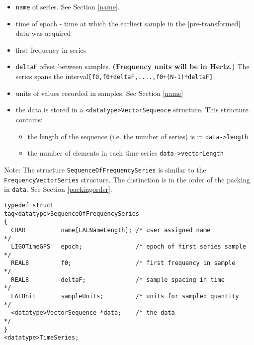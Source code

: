 \documentclass[]{ligodcc}
\begin{document}
\begin{itemize}
\vspace{-0.15in}
\item
{\tt name} of series. See Section \ref{name}.
\vspace{-0.15in}
\item
time of {epoch} - time at which the earliest sample in the
[pre-transformed] data was acquired
\vspace{-0.15in}
\item
first frequency in series
\vspace{-0.15in}
\item
{\tt deltaF} offset between samples.  {\bf (Frequency units will be in Hertz.)}
The series spans the interval{\tt [f0,f0+deltaF,....,f0+(N-1)*deltaF]}
\vspace{-0.15in}
\item
units of values recorded in samples. See Section \ref{name}
\vspace{-0.15in}
\item
the data is stored in a {\tt <datatype>VectorSequence}  structure. This structure contains:
\begin{itemize}
\vspace{-0.10in}
\item
the length of the sequence (i.e. the number of series) is  in {\tt data->length}
\vspace{-0.10in}
\item
 the number of elements in each time series {\tt data->vectorLength}
\end{itemize}
\end{itemize}


Note: The structure {\tt SequenceOfFrequencySeries} is similar to the
{\tt FrequencyVectorSeries} structure. The distinction is in the order of
the packing in {\tt *data}. See Section \ref{packingorder}.

{\footnotesize
\begin{verbatim}
typedef struct
tag<datatype>SequenceOfFrequencySeries
{
  CHAR          name[LALNameLength]; /* user assigned name           */
  LIGOTimeGPS   epoch;               /* epoch of first series sample */
  REAL8         f0;                  /* first frequency in sample    */
  REAL8         deltaF;              /* sample spacing in time       */
  LALUnit       sampleUnits;         /* units for sampled quantity   */
  <datatype>VectorSequence *data;    /* the data                     */
}
<datatype>TimeSeries;
\end{verbatim}}
\end{document}
